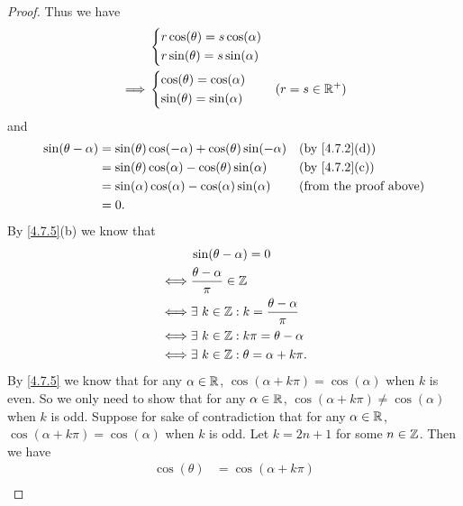 \begin{proof}
  Thus we have
  \begin{align*}
             & \begin{dcases}
                 r \cos(\theta) = s \cos(\alpha) \\
                 r \sin(\theta) = s \sin(\alpha)
               \end{dcases}     \\
    \implies & \begin{dcases}
                 \cos(\theta) = \cos(\alpha) \\
                 \sin(\theta) = \sin(\alpha)
               \end{dcases}     & (r = s \in \mathbb{R}^+)
  \end{align*}
  and
  \begin{align*}
    \sin(\theta - \alpha) & = \sin(\theta) \cos(-\alpha) + \cos(\theta) \sin(-\alpha) &  & \text{(by \cref{4.7.2}(d))}   \\
                          & = \sin(\theta) \cos(\alpha) - \cos(\theta) \sin(\alpha)   &  & \text{(by \cref{4.7.2}(c))}   \\
                          & = \sin(\alpha) \cos(\alpha) - \cos(\alpha) \sin(\alpha)   &  & \text{(from the proof above)} \\
                          & = 0.
  \end{align*}
  By \cref{4.7.5}(b) we know that
  \begin{align*}
         & \sin(\theta - \alpha) = 0                            \\
    \iff & \dfrac{\theta - \alpha}{\pi} \in \mathbb{Z}                  \\
    \iff & \exists\ k \in \mathbb{Z} : k = \dfrac{\theta - \alpha}{\pi} \\
    \iff & \exists\ k \in \mathbb{Z} : k \pi = \theta - \alpha          \\
    \iff & \exists\ k \in \mathbb{Z} : \theta = \alpha + k \pi.
  \end{align*}
  By \cref{4.7.5} we know that for any \(\alpha \in \mathbb{R}\), \(\cos(\alpha + k \pi) = \cos(\alpha)\) when \(k\) is even.
  So we only need to show that for any \(\alpha \in \mathbb{R}\), \(\cos(\alpha + k \pi) \neq \cos(\alpha)\) when \(k\) is odd.
  Suppose for sake of contradiction that for any \(\alpha \in \mathbb{R}\), \(\cos(\alpha + k \pi) = \cos(\alpha)\) when \(k\) is odd.
  Let \(k = 2n + 1\) for some \(n \in \mathbb{Z}\).
  Then we have
  \begin{align*}
    \cos(\theta) & = \cos(\alpha + k \pi)                                                   \\

\end{align*}
\end{proof}
